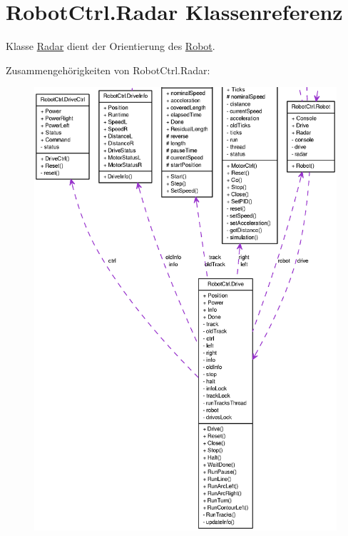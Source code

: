 \hypertarget{class_robot_ctrl_1_1_radar}{
\section{RobotCtrl.Radar Klassenreferenz}
\label{class_robot_ctrl_1_1_radar}
}


Klasse \hyperlink{class_robot_ctrl_1_1_radar}{Radar} dient der Orientierung des \hyperlink{class_robot_ctrl_1_1_robot}{Robot}.  




Zusammengehörigkeiten von RobotCtrl.Radar:\nopagebreak
\begin{figure}[H]
\begin{center}
\leavevmode
\includegraphics[width=400pt]{class_robot_ctrl_1_1_radar__coll__graph}
\end{center}
\end{figure}
